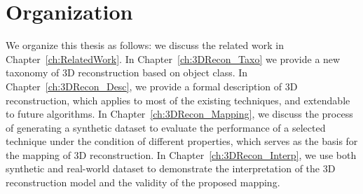 \section{Organization}
We organize this thesis as follows: we discuss the related work in Chapter~\ref{ch:RelatedWork}. In Chapter~\ref{ch:3DRecon_Taxo} we provide a new taxonomy of 3D reconstruction based on object class. In Chapter~\ref{ch:3DRecon_Desc}, we provide  a formal description of 3D reconstruction, which applies to most of the existing techniques, and extendable to future algorithms. In Chapter~\ref{ch:3DRecon_Mapping}, we discuss the process of generating a synthetic dataset to evaluate the performance of a selected technique under the condition of different properties, which serves as the basis for the mapping of 3D reconstruction. In Chapter~\ref{ch:3DRecon_Interp}, we use both synthetic and real-world dataset to demonstrate the interpretation of the 3D reconstruction model and the validity of the proposed mapping.
